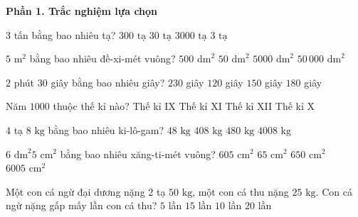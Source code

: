 \textbf{Phần 1. Trắc nghiệm lựa chọn}

\begin{ex} %
$3$ tấn bằng bao nhiêu tạ?
\choice
{$300\text{ tạ}$}
{\True $30\text{ tạ}$}
{$3000\text{ tạ}$}
{$3\text{ tạ}$}
\end{ex}

\begin{ex} %
$5\text{ m}^2$ bằng bao nhiêu đề-xi-mét vuông?
\choice
{\True $500\text{ dm}^2$}
{$50\text{ dm}^2$}
{$5000\text{ dm}^2$}
{$50\,000\text{ dm}^2$}
\end{ex}

\begin{ex} %
$2$ phút $30$ giây bằng bao nhiêu giây?
\choice
{$230$ giây}
{$120$ giây}
{\True $150$ giây}
{$180$ giây}
\end{ex}

\begin{ex} %
Năm $1000$ thuộc thế kỉ nào?
\choice
{Thế kỉ IX}
{Thế kỉ XI}
{Thế kỉ XII}
{\True Thế kỉ X}
\end{ex}

\begin{ex} %
$4$ tạ $8\text{ kg}$ bằng bao nhiêu ki-lô-gam?
\choice
{$48\text{ kg}$}
{\True $408\text{ kg}$}
{$480\text{ kg}$}
{$4008\text{ kg}$}
\end{ex}

\begin{ex} %
$6\text{ dm}^2 5\text{ cm}^2$ bằng bao nhiêu xăng-ti-mét vuông?
\choice
{\True $605\text{ cm}^2$}
{$65\text{ cm}^2$}
{$650\text{ cm}^2$}
{$6005\text{ cm}^2$}
\end{ex}

\begin{ex} %
Một con cá ngừ đại dương nặng $2$ tạ $50\text{ kg}$, một con cá thu nặng $25\text{ kg}$. Con cá ngừ nặng gấp mấy lần con cá thu?
\choice
{$5$ lần}
{$15$ lần}
{\True $10$ lần}
{$20$ lần}
\end{ex}

